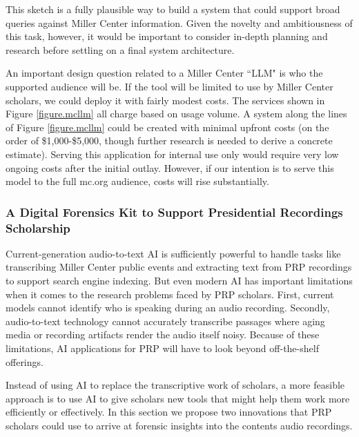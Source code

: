 \documentclass[12pt, oneside]{article}   	%
\begin{document}
This sketch is a fully plausible way to build a system that could support broad queries against Miller Center information.  Given the novelty and ambitiousness of this task, however, it would be important to consider in-depth planning and research before settling on a final system architecture.  

An important design question related to a Miller Center ``LLM" is who the supported audience will be.  If the tool will be limited to use by Miller Center scholars, we could deploy it with fairly modest costs.  The services shown in Figure \ref{figure.mcllm} all charge based on usage volume.  A system along the lines of Figure \ref{figure.mcllm} could be created with minimal upfront costs (on the order of \$1,000-\$5,000, though further research is needed to derive a concrete estimate).  Serving this application for internal use only would require very low ongoing costs after the initial outlay.  However, if our intention is to serve this model to the full mc.org audience, costs will rise substantially.   




\subsubsection{A Digital Forensics Kit to Support Presidential Recordings Scholarship}\label{section.applications.hard.prp}
Current-generation audio-to-text AI is sufficiently powerful to handle tasks like transcribing Miller Center public events and extracting text from PRP recordings to support search engine indexing.  But even modern AI has important limitations when it comes to the research problems faced by PRP scholars.  First, current models cannot identify who is speaking during an audio recording.  Secondly, audio-to-text technology cannot accurately transcribe passages where aging media or recording artifacts render the audio itself noisy.   Because of these limitations, AI applications for PRP will have to look beyond off-the-shelf offerings.  


Instead of using AI to replace the transcriptive work of scholars, a more feasible approach is to use AI to give scholars new tools that might help them work more efficiently or effectively.  In this section we propose two innovations that PRP scholars could use to arrive at forensic insights into the contents audio recordings.
\end{document}
